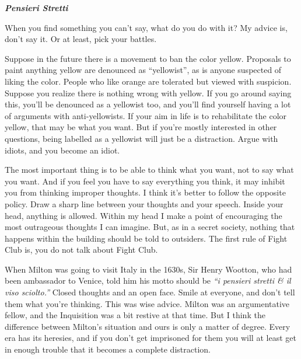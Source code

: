 \documentclass[12pt]{book}
\begin{document}
\textbf{\emph{Pensieri Stretti}}

When you find something you can't say, what do you do with it? My advice
is, don't say it. Or at least, pick your battles.

Suppose in the future there is a movement to ban the color yellow.
Proposals to paint anything yellow are denounced as ``yellowist'', as is
anyone suspected of liking the color. People who like orange are
tolerated but viewed with suspicion. Suppose you realize there is
nothing wrong with yellow. If you go around saying this, you'll be
denounced as a yellowist too, and you'll find yourself having a lot of
arguments with anti-yellowists. If your aim in life is to rehabilitate
the color yellow, that may be what you want. But if you're mostly
interested in other questions, being labelled as a yellowist will just
be a distraction. Argue with idiots, and you become an idiot.

The most important thing is to be able to think what you want, not to
say what you want. And if you feel you have to say everything you think,
it may inhibit you from thinking improper thoughts. I think it's better
to follow the opposite policy. Draw a sharp line between your thoughts
and your speech. Inside your head, anything is allowed. Within my head I
make a point of encouraging the most outrageous thoughts I can imagine.
But, as in a secret society, nothing that happens within the building
should be told to outsiders. The first rule of Fight Club is, you do not
talk about Fight Club.

When Milton was going to visit Italy in the 1630s, Sir Henry Wootton,
who had been ambassador to Venice, told him his motto should be
\emph{``i pensieri stretti \& il viso sciolto.''} Closed thoughts and an
open face. Smile at everyone, and don't tell them what you're thinking.
This was wise advice. Milton was an argumentative fellow, and the
Inquisition was a bit restive at that time. But I think the difference
between Milton's situation and ours is only a matter of degree. Every
era has its heresies, and if you don't get imprisoned for them you will
at least get in enough trouble that it becomes a complete distraction.
\end{document}

